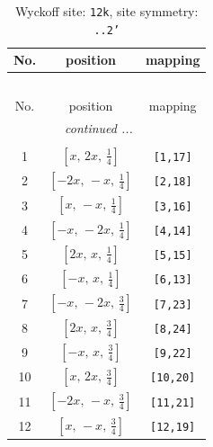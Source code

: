 \documentclass[fleqn,8pt]{jsarticle}
\begin{document}
\begin{longtable}{ccc}
\caption{Wyckoff site: {\tt 12k}, site symmetry: {\tt ..2'}}
 \\
 \hline \hline
No. & position & mapping \\ \hline \endfirsthead

\multicolumn{2}{l}{\tablename\ \thetable{}} \\
 \hline \hline
No. & position & mapping \\ \hline \endhead

 \hline \hline
\multicolumn{2}{r}{\footnotesize\it continued ...} \\ \endfoot

 \hline \hline
\multicolumn{2}{r}{} \\ \endlastfoot

1 & $\left[ x,\, 2 x,\, \frac{1}{4} \right]$ & {\tt [1,17]} \\ \hline
2 & $\left[ - 2 x,\, - x,\, \frac{1}{4} \right]$ & {\tt [2,18]} \\ \hline
3 & $\left[ x,\, - x,\, \frac{1}{4} \right]$ & {\tt [3,16]} \\ \hline
4 & $\left[ - x,\, - 2 x,\, \frac{1}{4} \right]$ & {\tt [4,14]} \\ \hline
5 & $\left[ 2 x,\, x,\, \frac{1}{4} \right]$ & {\tt [5,15]} \\ \hline
6 & $\left[ - x,\, x,\, \frac{1}{4} \right]$ & {\tt [6,13]} \\ \hline
7 & $\left[ - x,\, - 2 x,\, \frac{3}{4} \right]$ & {\tt [7,23]} \\ \hline
8 & $\left[ 2 x,\, x,\, \frac{3}{4} \right]$ & {\tt [8,24]} \\ \hline
9 & $\left[ - x,\, x,\, \frac{3}{4} \right]$ & {\tt [9,22]} \\ \hline
10 & $\left[ x,\, 2 x,\, \frac{3}{4} \right]$ & {\tt [10,20]} \\ \hline
11 & $\left[ - 2 x,\, - x,\, \frac{3}{4} \right]$ & {\tt [11,21]} \\ \hline
12 & $\left[ x,\, - x,\, \frac{3}{4} \right]$ & {\tt [12,19]} \\
\end{longtable}
\renewcommand{\arraystretch}{1.2}
\end{document}
